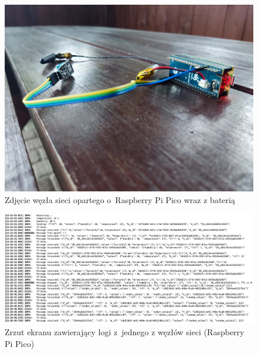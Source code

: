 \begin{figure}[b!]
    \begin{center}
        \includegraphics[width=13cm]{pic/wezel1.jpg}
    \end{center}
    \caption{Zdjęcie węzła sieci opartego o~Raspberry Pi Pico wraz z baterią}\label{rys:wezel1}
\end{figure}

\begin{figure}[b!]
    \begin{center}
        \includegraphics[width=13cm]{pic/logi-pico.png}
    \end{center}
    \caption{Zrzut ekranu zawierający logi z~jednego z węzłów sieci (Raspberry Pi Pico)}\label{rys:logi-pico}
\end{figure}

